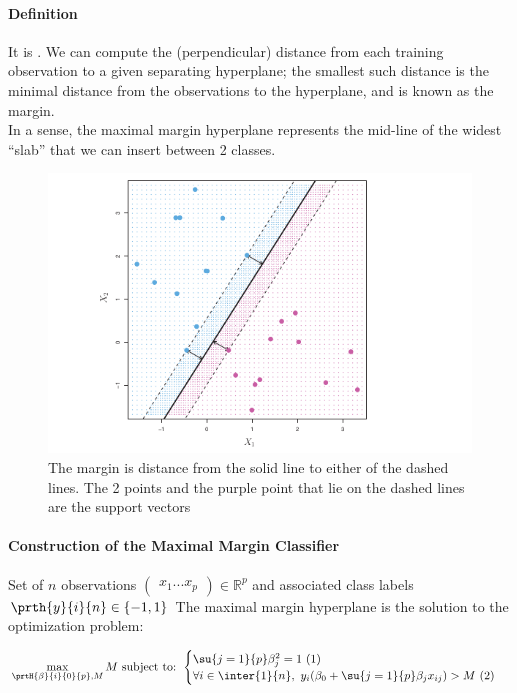 \paragraph{Definition}
It is . We can compute the (perpendicular) distance from each
training observation to a given separating hyperplane; the smallest
such distance is the minimal distance from the observations to the
hyperplane, and is known as the margin.\\
In a sense, the maximal margin hyperplane represents the mid-line of 
the widest ``slab'' that we can insert between 2 classes.

\begin{figure}[H]
	\begin{center}
		\includegraphics[width=\textwidth]{./chap/1chap/8sec/images/1margineSVM.png}
	\end{center}
	\caption{The margin is distance from the solid line to either
	of the dashed lines. The 2 points and the purple point that 
	lie on the dashed lines are the support vectors}
	\label{fig:8.1margineSVM}
\end{figure}

\paragraph{Construction of the Maximal Margin Classifier}
Set of $n$ observations $
\begin{pmatrix}
	x_{1}
	.
	.
	.
	x_{p}
\end{pmatrix}\in\mathbb{R}^{p}
$ and associated class labels $\prth{y}{i}{n}\in\{-1,1\}$
The maximal margin hyperplane is the solution to the optimization 
problem:
\begin{center}
$ \max\limits_{\prtH{\beta}{i}{0}{p},M}M 
\text{ subject to: }
\begin{cases}
	\su{{j=1}}{p}\beta_{j}^{2}=1~(1)\\
	\forall i\in\inter{1}{n},~y_{i}(\beta_{0}+\su{{j=1}}{p}\beta_{j}x_{ij})>M~(2)
\end{cases} $
\end{center}

